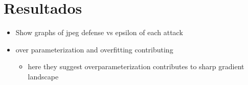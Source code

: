 \section{Resultados}
\begin{itemize}
    \item Show graphs of jpeg defense vs epsilon of each attack 
    \item over parameterization and overfitting contributing
    \begin{itemize}
        \item here they suggest overparameterization contributes to sharp gradient landscape \cite{ma2020understanding}
    \end{itemize}
\end{itemize}